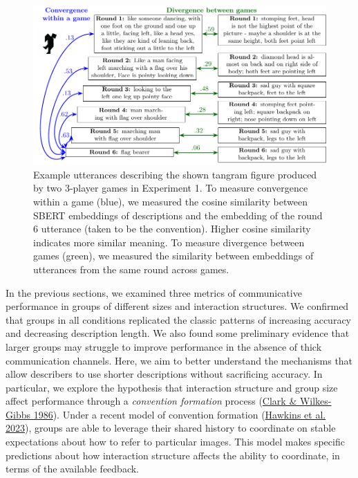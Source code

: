 \documentclass[
  english,
]{article}
\begin{document}
\begin{figure}[t!]

{\centering \includegraphics[width=1\linewidth]{sbert} 

}

\caption{Example utterances describing the shown tangram figure produced by two 3-player games in Experiment 1. To measure convergence within a game (blue), we measured the cosine similarity between SBERT embeddings of descriptions and the embedding of the round 6 utterance (taken to be the convention). Higher cosine similarity indicates more similar meaning. To measure divergence between games (green), we measured the similarity between embeddings of utterances from the same round across games.}\label{fig:sbert-diagram}
\end{figure}

In the previous sections, we examined three metrics of communicative performance in groups of different sizes and interaction structures.
We confirmed that groups in all conditions replicated the classic patterns of increasing accuracy and decreasing description length.
We also found some preliminary evidence that larger groups may struggle to improve performance in the absence of thick communication channels.
Here, we aim to better understand the mechanisms that allow describers to use shorter descriptions without sacrificing accuracy.
In particular, we explore the hypothesis that interaction structure and group size affect performance through a \emph{convention formation} process (\protect\hyperlink{ref-clark1986}{Clark \& Wilkes-Gibbs 1986}).
Under a recent model of convention formation (\protect\hyperlink{ref-hawkins2023partners}{Hawkins et al. 2023}), groups are able to leverage their shared history to coordinate on stable expectations about how to refer to particular images.
This model makes specific predictions about how interaction structure affects the ability to coordinate, in terms of the available feedback.
\end{document}
